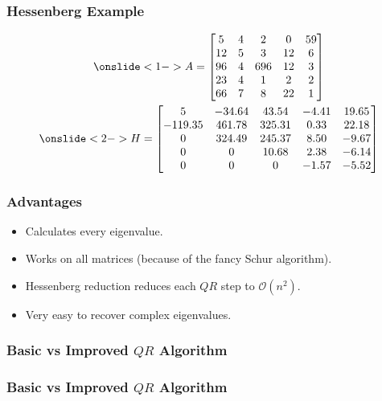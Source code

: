 \documentclass{beamer}
\begin{document}
\begin{frame}
	\frametitle{Hessenberg Example}
	\vspace*{-\abovedisplayskip}
	\begin{gather*}
		\onslide<1->{A=\begin{bmatrix}
			5 & 4 & 2 & 0 & 59 \\
			12 & 5 & 3 & 12 & 6 \\
			96 & 4 & 696 & 12 & 3 \\
			23 & 4 & 1 & 2 & 2 \\
			66 & 7 & 8 & 22 & 1 \\
		\end{bmatrix}} \\
		\onslide<2->{H=\begin{bmatrix}
			5 & -34.64 & 43.54 & -4.41 & 19.65 \\
			-119.35 & 461.78 & 325.31 & 0.33 & 22.18 \\
			0 & 324.49 & 245.37 & 8.50 & -9.67 \\
			0 & 0 & 10.68 & 2.38 & -6.14 \\
			0 & 0 & 0 & -1.57 & -5.52 \\
		\end{bmatrix}}
	\end{gather*}
\end{frame}

\begin{frame}
	\frametitle{Advantages}
	\begin{itemize}
		\item<1-> Calculates every eigenvalue.
		\item<2-> Works on all matrices (because of the fancy Schur algorithm).
		\item<3-> Hessenberg reduction reduces each $QR$ step to $\mathcal O(n^2)$.
		\item<4-> Very easy to recover complex eigenvalues.
	\end{itemize}
\end{frame}

\begin{frame}
	\frametitle{Basic vs Improved $QR$ Algorithm}
	\begin{center}
		\resizebox{0.8\textwidth}{!}{}
	\end{center}
\end{frame}

\begin{frame}
	\frametitle{Basic vs Improved $QR$ Algorithm}
	\begin{center}
		\resizebox{0.8\textwidth}{!}{}
	\end{center}
\end{frame}
\end{document}
